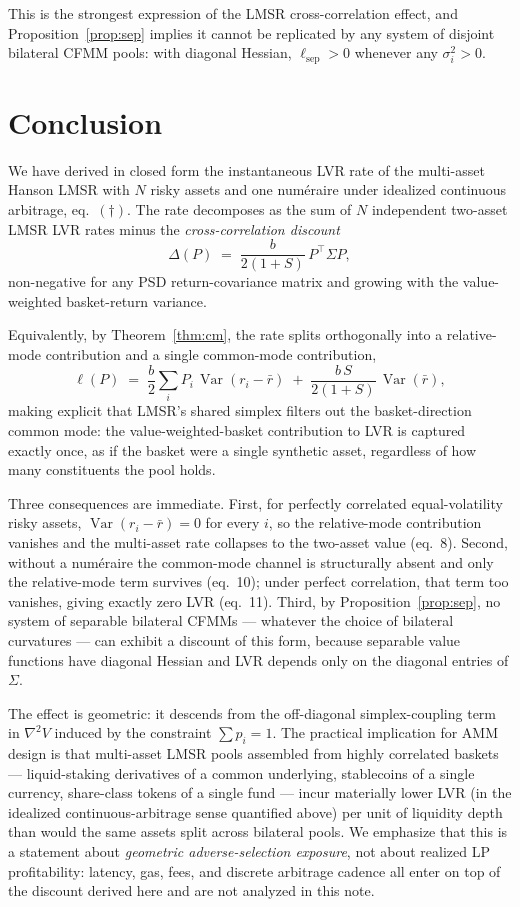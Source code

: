\documentclass[11pt]{article}
\DeclareMathOperator{\Var}{Var}
\newcommand{\sep}{\mathrm{sep}}
\newcommand{\transp}{^{\!\top}}
\begin{document}
This is the strongest expression of the LMSR cross-correlation effect, and Proposition~\ref{prop:sep} implies it cannot be replicated by any system of disjoint bilateral CFMM pools: with diagonal Hessian, $\ell_{\sep} > 0$ whenever any $\sigma_i^2 > 0$.

\section{Conclusion}\label{sec:conclusion}

We have derived in closed form the instantaneous LVR rate of the multi-asset Hanson LMSR with $N$ risky assets and one num\'eraire under idealized continuous arbitrage, eq.~$(\dagger)$. The rate decomposes as the sum of $N$ independent two-asset LMSR LVR rates minus the \emph{cross-correlation discount}
\[
\Delta(P) \;=\; \frac{b}{2(1+S)}\, P\transp\Sigma P,
\]
non-negative for any PSD return-covariance matrix and growing with the value-weighted basket-return variance.

Equivalently, by Theorem~\ref{thm:cm}, the rate splits orthogonally into a relative-mode contribution and a single common-mode contribution,
\[
\ell(P) \;=\; \frac{b}{2}\sum_i P_i\,\Var(r_i - \bar r) \;+\; \frac{b\,S}{2(1+S)}\,\Var(\bar r),
\]
making explicit that LMSR's shared simplex filters out the basket-direction common mode: the value-weighted-basket contribution to LVR is captured exactly once, as if the basket were a single synthetic asset, regardless of how many constituents the pool holds.

Three consequences are immediate. First, for perfectly correlated equal-volatility risky assets, $\Var(r_i - \bar r) = 0$ for every $i$, so the relative-mode contribution vanishes and the multi-asset rate collapses to the two-asset value (eq.~8). Second, without a num\'eraire the common-mode channel is structurally absent and only the relative-mode term survives (eq.~10); under perfect correlation, that term too vanishes, giving exactly zero LVR (eq.~11). Third, by Proposition~\ref{prop:sep}, no system of separable bilateral CFMMs --- whatever the choice of bilateral curvatures --- can exhibit a discount of this form, because separable value functions have diagonal Hessian and LVR depends only on the diagonal entries of $\Sigma$.

The effect is geometric: it descends from the off-diagonal simplex-coupling term in $\nabla^2 V$ induced by the constraint $\sum p_i = 1$. The practical implication for AMM design is that multi-asset LMSR pools assembled from highly correlated baskets --- liquid-staking derivatives of a common underlying, stablecoins of a single currency, share-class tokens of a single fund --- incur materially lower LVR (in the idealized continuous-arbitrage sense quantified above) per unit of liquidity depth than would the same assets split across bilateral pools. We emphasize that this is a statement about \emph{geometric adverse-selection exposure}, not about realized LP profitability: latency, gas, fees, and discrete arbitrage cadence all enter on top of the discount derived here and are not analyzed in this note.
\end{document}
